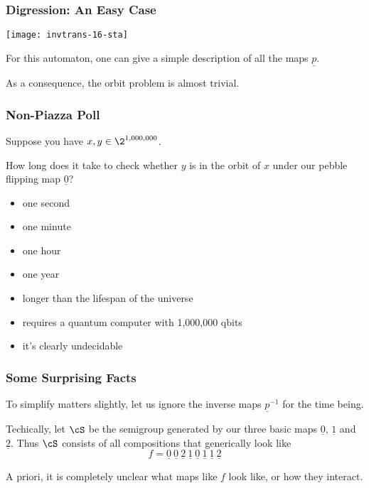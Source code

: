\documentclass[handout,10pt]{ksbeamer}
\def\F#1{\underline{#1}}
\begin{document}
\begin{frame} 
\frametitle{Digression: An Easy Case}

\begin{center}
\texttt{[image: invtrans-16-sta]}
\end{center}
\vspace{3ex} 

For this automaton, one can give a simple description of all the maps $\F{p}$.
\vspace{2ex}

As a consequence, the orbit problem is almost trivial. 

\end{frame}


\begin{frame}
\frametitle{Non-Piazza Poll}

Suppose you have $x, y \in \2^{1,000,000}$. 

How long does it take to check whether $y$ is in the orbit of $x$ 
under our pebble flipping map  $\F{0}$? 
\vspace{2ex} 

\begin{itemize}
\item  one second
\item  one minute
\item  one hour
\item  one year
\item  longer than the lifespan of the universe
\item  requires a quantum computer with 1,000,000 qbits
\item  it's clearly undecidable
\end{itemize}

\end{frame}



\begin{frame}
\frametitle{Some Surprising Facts}

To simplify matters slightly, let us ignore the inverse maps
$\F{p}^{-1}$ for the time being. 
\vspace{3ex} 

Techically, let $\cS$ be the semigroup generated by our three basic maps $\F{0}$, 
$\F{1}$ and $\F{2}$. 
Thus $\cS$ consists of all compositions that generically look like
%
$$
    f = \F{0} \: \F{0} \: \F{2} \: \F{1} \: \F{0} \: \F{1} \: \F{1} \: \F{2} 
$$
%
\vspace{5ex} 

A priori, it is completely unclear what maps like $f$ look
like, or how they interact. 

\end{frame}
\end{document}
